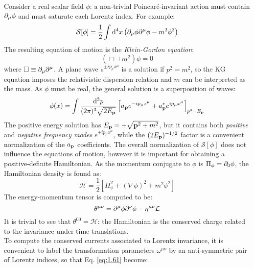 Consider a real scalar field $ \phi $: a non-trivial Poincaré-invariant action must contain $ \partial_\mu \phi $ and must saturate each Lorentz index. For example:
\begin{equation}
  \mathcal{S}[\phi] = \frac{1}{2} \int \mathrm{d}^4 x \left( \partial_\mu \phi \partial^\mu \phi - m^2 \phi^2 \right)
  \label{eq:1.68}
\end{equation}
The resulting equation of motion is the \textit{Klein-Gordon equation}:
\begin{equation}
  \left( \Box + m^2 \right) \phi = 0
  \label{eq:1.69}
\end{equation}
where $ \Box \equiv \partial_\mu \partial^\mu $. A plane wave $ e^{\pm i p_\mu x^\mu} $ is a solution if $ p^2 = m^2 $, so the KG equation imposes the relativistic dispersion relation and $ m $ can be interpreted as the mass. As $ \phi $ must be real, the general solution is a superposition of waves:
\begin{equation}
  \phi(x) = \int \frac{\mathrm{d}^3 p}{(2\pi)^3 \sqrt{2E_{\mathbf{p}}}} \left[ a_{\mathbf{p}} e^{-i p_\mu x^\mu} + a^*_{\mathbf{p}} e^{i p_\mu x^\mu} \right]_{p^0 = E_{\mathbf{p}}}
  \label{eq:1.70}
\end{equation}
The positive energy solution has $ E_{\mathbf{p}} = + \sqrt{\mathbf{p}^2 + m^2} $, but it contains both \textit{positive} and \textit{negative frequency modes} $ e^{\mp i p_\mu x^\mu} $, while the $ (2E_{\mathbf{p}})^{-1/2} $ factor is a convenient normalization of the $ a_{\mathbf{p}} $ coefficients. The overall normalization of $ \mathcal{S}[\phi] $ does not influence the equations of motion, however it is important for obtaining a positive-definite Hamiltonian. As the momentum conjugate to $ \phi $ is $ \Pi_\phi = \partial_0 \phi $, the Hamiltonian density is found as:
\begin{equation}
  \mathcal{H} = \frac{1}{2} \left[ \Pi_\phi^2 + (\nabla \phi)^2 + m^2 \phi^2 \right]
  \label{eq:1.71}
\end{equation}
The energy-momentum tensor is computed to be:
\begin{equation}
  \theta^{\mu \nu} = \partial^\mu \phi \partial^\nu \phi - \eta^{\mu \nu} \mathcal{L}
  \label{eq:1.72}
\end{equation}
It is trivial to see that $ \theta^{00} = \mathcal{H} $: the Hamiltonian is the conserved charge related to the invariance under time translations.\\
To compute the conserved currents associated to Lorentz invariance, it is convenient to label the transformation parameters $ \omega^{\mu \nu} $ by an anti-symmetric pair of Lorentz indices, so that Eq. \ref{eq:1.61} become:

